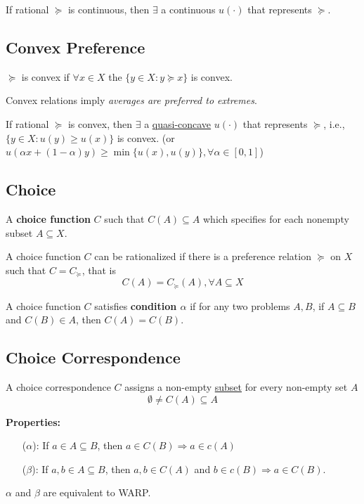 \documentclass[11pt]{elegantbook}
\begin{document}
\begin{proposition}
    If rational $\succeq$ is continuous, then $\exists$ a continuous $u(\cdot)$ that represents $\succeq$.
\end{proposition}

\subsection{Convex Preference}
\begin{definition}
    \normalfont
    $\succeq$ is convex if $\forall x\in X$ the $\{y\in X: y\succeq x\}$ is convex.
\end{definition}
Convex relations imply \textit{averages are preferred to extremes}.
\begin{proposition}
    If rational $\succeq$ is convex, then $\exists$ a \underline{quasi-concave} $u(\cdot)$ that represents $\succeq$, i.e., $\{y\in X: u(y)\geq u(x)\}$ is convex. (or $u(\alpha x+(1-\alpha)y)\geq \min \{u(x),u(y)\}, \forall \alpha\in [0,1]$)
\end{proposition}


\subsection{Choice}
\begin{definition}
    \normalfont
    A \textbf{choice function} $C$ such that $C(A)\subseteq A$ which specifies for each nonempty subset $A\subseteq X$.
\end{definition}
A choice function $C$ can be rationalized if there is a preference relation $\succeq$ on $X$ such that $C=C_\succeq$, that is $$C(A)=C_\succeq(A), \forall A\subseteq X$$

\begin{definition}
    \normalfont
    A choice function $C$ satisfies \textbf{condition $\alpha$} if for any two problems $A,B$, if $A\subseteq B$ and $C(B)\in A$, then $C(A)=C(B)$.
\end{definition}

\subsection{Choice Correspondence}
\begin{definition}
    \normalfont
    A choice correspondence $C$ assigns a non-empty \underline{subset} for every non-empty set $A$
    $$\emptyset\neq C(A)\subseteq A$$
\end{definition}
\textbf{Properties:}
\begin{enumerate}
    \item[($\alpha$):] If $a\in A\subseteq B$, then $a\in C(B) \Rightarrow a\in c(A)$
    \item[($\beta$):] If $a,b\in A\subseteq B$, then $a,b\in C(A)$ and $b\in c(B) \Rightarrow a\in C(B)$.
\end{enumerate}
$\alpha$ and $\beta$ are equivalent to WARP.
\end{document}
